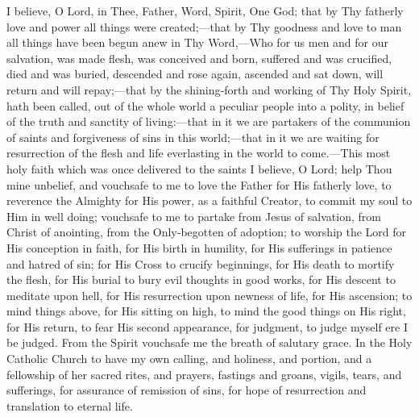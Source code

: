 
I believe, O Lord, in Thee, Father, Word, Spirit, One God; that by Thy fatherly love and power all things were created;—that by Thy goodness and love to man all things have been begun anew in Thy Word,—Who for us men and for our salvation, was made flesh, was conceived and born, suffered and was crucified, died and was buried, descended and rose again, ascended and sat down, will return and will repay;—that by the shining‑forth and working of Thy Holy Spirit,  hath been called, out of the whole world a peculiar people into a polity, in belief of the truth and sanctity of living:—that in it we are partakers of the communion of saints and forgiveness of sins in this world;—that in it we are waiting for resurrection of the flesh and life everlasting in the world to come.—This most holy faith which was once delivered to the saints I believe, O Lord; help Thou mine unbelief, and vouchsafe to me to love the Father for His fatherly love, to reverence the Almighty for His power, as a faithful Creator, to commit my soul to Him in well doing; vouchsafe to me to partake from Jesus of salvation, from Christ of anointing, from the Only‑begotten of adoption; to worship the Lord for His conception in faith, for His birth in humility, for His sufferings in patience and hatred of sin; for His Cross to crucify beginnings, for His death to mortify the flesh, for His burial to bury evil thoughts in good works, for His descent to meditate upon hell, for His resurrection upon newness of life, for His ascension; to mind things above, for His sitting on high, to mind the good things on His right, for His return, to fear His second appearance, for judgment, to judge myself ere I be judged. From the Spirit vouchsafe me the breath of salutary grace. In the Holy Catholic Church to have my own calling, and holiness, and portion, and a fellowship of her sacred rites, and prayers, fastings and groans, vigils, tears, and sufferings, for assurance of remission of sins, for hope of resurrection and translation to eternal life.


